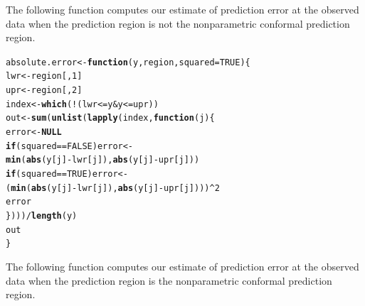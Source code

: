 \documentclass[11pt]{article}\usepackage[]{graphicx}\usepackage[]{color}
\makeatletter
\newcommand{\hlnum}[1]{\textcolor[rgb]{0.686,0.059,0.569}{#1}}%
\newcommand{\hlopt}[1]{\textcolor[rgb]{0,0,0}{#1}}%
\newcommand{\hlstd}[1]{\textcolor[rgb]{0.345,0.345,0.345}{#1}}%
\newcommand{\hlkwa}[1]{\textcolor[rgb]{0.161,0.373,0.58}{\textbf{#1}}}%
\newcommand{\hlkwb}[1]{\textcolor[rgb]{0.69,0.353,0.396}{#1}}%
\newcommand{\hlkwc}[1]{\textcolor[rgb]{0.333,0.667,0.333}{#1}}%
\newcommand{\hlkwd}[1]{\textcolor[rgb]{0.737,0.353,0.396}{\textbf{#1}}}%
\newenvironment{kframe}{%
 \def\at@end@of@kframe{}%
 \ifinner\ifhmode%
  \def\at@end@of@kframe{\end{minipage}}%
  \begin{minipage}{\columnwidth}%
 \fi\fi%
 \def\FrameCommand##1{\hskip\@totalleftmargin \hskip-\fboxsep
 \colorbox{shadecolor}{##1}\hskip-\fboxsep
     \hskip-\linewidth \hskip-\@totalleftmargin \hskip\columnwidth}%
 \MakeFramed {\advance\hsize-\width
   \@totalleftmargin\z@ \linewidth\hsize
   \@setminipage}}%
 {\par\unskip\endMakeFramed%
 \at@end@of@kframe}
\newenvironment{knitrout}{}{} %
\makeatother
\begin{document}
The following function computes our estimate of prediction error at the 
observed data when the prediction region is not the nonparametric 
conformal prediction region.

\begin{knitrout}
\color{fgcolor}\begin{kframe}
\begin{alltt}
\hlstd{absolute.error} \hlkwb{<-} \hlkwa{function}\hlstd{(}\hlkwc{y}\hlstd{,} \hlkwc{region}\hlstd{,} \hlkwc{squared} \hlstd{=} \hlnum{TRUE}\hlstd{)\{}
  \hlstd{lwr} \hlkwb{<-} \hlstd{region[,} \hlnum{1}\hlstd{]}
  \hlstd{upr} \hlkwb{<-} \hlstd{region[,} \hlnum{2}\hlstd{]}
  \hlstd{index} \hlkwb{<-} \hlkwd{which}\hlstd{(}\hlopt{!}\hlstd{(lwr} \hlopt{<=} \hlstd{y} \hlopt{&} \hlstd{y} \hlopt{<=} \hlstd{upr))}
  \hlstd{out} \hlkwb{<-} \hlkwd{sum}\hlstd{(}\hlkwd{unlist}\hlstd{(}\hlkwd{lapply}\hlstd{(index,} \hlkwa{function}\hlstd{(}\hlkwc{j}\hlstd{)\{}
    \hlstd{error} \hlkwb{<-} \hlkwa{NULL}
    \hlkwa{if}\hlstd{(squared} \hlopt{==} \hlnum{FALSE}\hlstd{) error} \hlkwb{<-}
      \hlkwd{min}\hlstd{(}\hlkwd{abs}\hlstd{(y[j]} \hlopt{-} \hlstd{lwr[j]),} \hlkwd{abs}\hlstd{(y[j]} \hlopt{-} \hlstd{upr[j]))}
    \hlkwa{if}\hlstd{(squared} \hlopt{==} \hlnum{TRUE}\hlstd{) error} \hlkwb{<-}
      \hlstd{(}\hlkwd{min}\hlstd{(}\hlkwd{abs}\hlstd{(y[j]} \hlopt{-} \hlstd{lwr[j]),} \hlkwd{abs}\hlstd{(y[j]} \hlopt{-} \hlstd{upr[j])))}\hlopt{^}\hlnum{2}
    \hlstd{error}
  \hlstd{\})))} \hlopt{/} \hlkwd{length}\hlstd{(y)}
  \hlstd{out}
\hlstd{\}}
\end{alltt}
\end{kframe}
\end{knitrout}

The following function computes our estimate of prediction error at the 
observed data when the prediction region is the nonparametric conformal 
prediction region.
\end{document}

